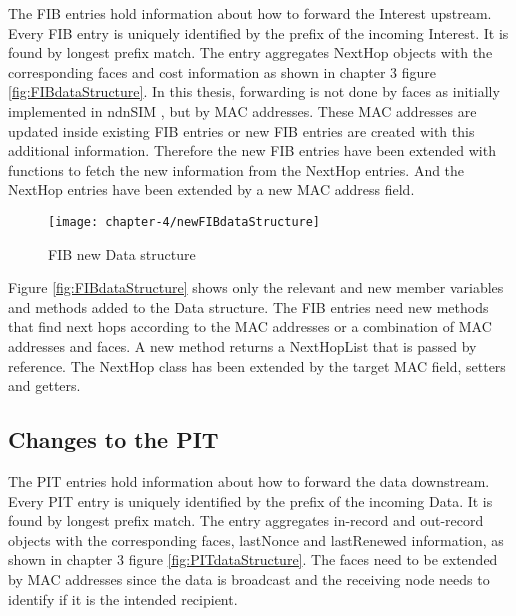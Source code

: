 The FIB entries hold information about how to forward the Interest upstream. Every FIB entry is uniquely identified by the prefix of the incoming Interest. It is found by longest prefix match. The entry aggregates NextHop objects with the corresponding faces and cost information as shown in chapter 3 figure \ref{fig:FIBdataStructure}.
In this thesis, forwarding is not done by faces as initially implemented in ndnSIM \cite{Afanasyev16}, but by MAC addresses. These MAC addresses are updated inside existing FIB entries or new FIB entries are created with this additional information. Therefore the new FIB entries have been extended with functions to fetch the new information from the NextHop entries. And the NextHop entries have been extended by a new MAC address field.

\vspace{5mm} %

\begin{figure}[H]
  \centering
  \texttt{[image: chapter-4/newFIBdataStructure]}
  \caption{FIB new Data structure}
  \label{fig:newFIBdataStructure}
\end{figure}

\vspace{5mm} %

Figure \ref{fig:FIBdataStructure} shows only the relevant and new member variables and methods added to the Data structure. The FIB entries need new methods that find next hops according to the MAC addresses or a combination of MAC addresses and faces. A new method returns a NextHopList that is passed by reference. The NextHop class has been extended by the target MAC field, setters and getters.

\newpage

\subsection{Changes to the PIT}

The PIT entries hold information about how to forward the data downstream. Every PIT entry is uniquely identified by the prefix of the incoming Data. It is found by longest prefix match. The entry aggregates in-record and out-record objects with the corresponding faces, lastNonce and lastRenewed information, as shown in chapter 3 figure \ref{fig:PITdataStructure}. The faces need to be extended by MAC addresses since the data is broadcast and the receiving node needs to identify if it is the intended recipient.

